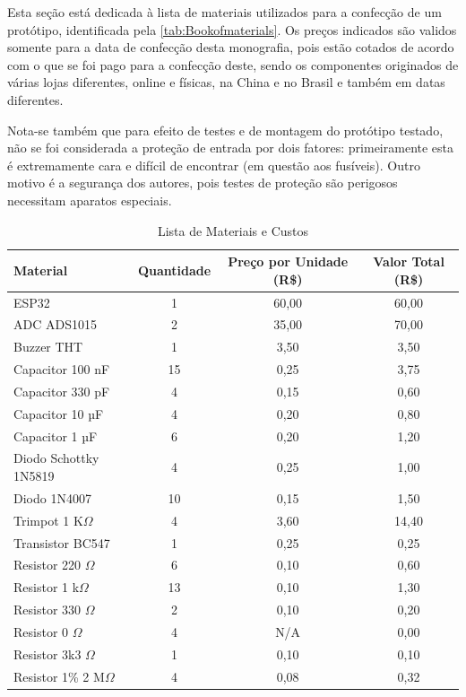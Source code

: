 Esta seção está dedicada à lista de materiais utilizados para a confecção de um protótipo, identificada pela \autoref{tab:Bookofmaterials}. Os preços indicados são validos somente para a data de confecção desta monografia, pois estão cotados de acordo com o que se foi pago para a confecção deste, sendo os componentes originados de várias lojas diferentes, online e físicas, na China e no Brasil e também em datas diferentes.

Nota-se também que para efeito de testes e de montagem do protótipo testado, não se foi considerada a proteção de entrada por dois fatores: primeiramente esta é extremamente cara e difícil de encontrar (em questão aos fusíveis). Outro motivo é a segurança dos autores, pois testes de proteção são perigosos necessitam aparatos especiais.

\begin{table}[h!]
\centering
\caption{Lista de Materiais e Custos}
\label{tab:Bookofmaterials}
\begin{tabular}{ l c c c }
\hline
\textbf{Material} & \textbf{Quantidade} & \textbf{Preço por Unidade (R\$)} & \textbf{Valor Total (R\$)} \\ \hline
ESP32 & 1 & 60,00 & 60,00 \\ \hline
ADC ADS1015 & 2 & 35,00 & 70,00 \\ \hline
Buzzer THT & 1 & 3,50 & 3,50 \\ \hline
Capacitor 100 nF & 15 & 0,25 & 3,75 \\ \hline
Capacitor 330 pF & 4 & 0,15 & 0,60 \\ \hline
Capacitor 10 µF & 4 & 0,20 & 0,80 \\ \hline
Capacitor 1 µF & 6 & 0,20 & 1,20 \\ \hline
Diodo Schottky 1N5819 & 4 & 0,25 & 1,00 \\ \hline
Diodo 1N4007 & 10 & 0,15 & 1,50 \\ \hline
Trimpot 1 K$\Omega$ & 4 & 3,60 & 14,40 \\ \hline
Transistor BC547 & 1 & 0,25 & 0,25 \\ \hline
Resistor 220 $\Omega$ & 6 & 0,10 & 0,60 \\ \hline
Resistor 1 k$\Omega$ & 13 & 0,10 & 1,30 \\ \hline
Resistor 330 $\Omega$ & 2 & 0,10 & 0,20 \\ \hline
Resistor 0 $\Omega$ & 4 & N/A & 0,00 \\ \hline
Resistor 3k3 $\Omega$ & 1 & 0,10 & 0,10 \\ \hline
Resistor 1\% 2 M$\Omega$ & 4 & 0,08 & 0,32 \\ \hline

\end{tabular}
\end{table}
